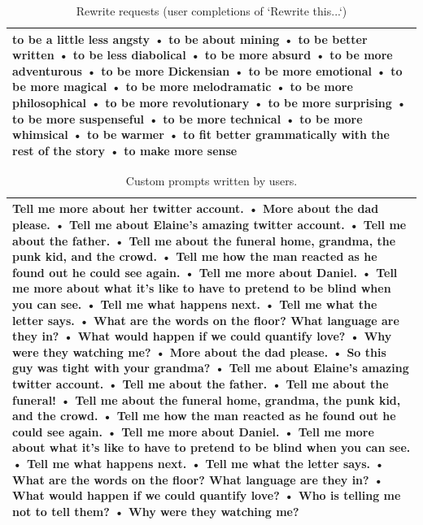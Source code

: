 \begin{table}
\caption{Rewrite requests (user completions of `Rewrite this...`)}
\label{tab:rewrites}
\small
\begin{tabular}{p{}}
\toprule
to be a little less angsty • to be about mining • to be better written • to be less diabolical • to be more absurd • to be more adventurous • to be more Dickensian • to be more emotional • to be more magical • to be more melodramatic • to be more philosophical • to be more revolutionary • to be more surprising • to be more suspenseful • to be more technical • to be more whimsical • to be warmer • to fit better grammatically with the rest of the story • to make more sense \\
\bottomrule
\end{tabular}
\end{table}

\begin{table}
\caption{Custom prompts written by users.}
\label{tab:custom_prompts}
\small
\begin{tabular}{p{}}
\toprule
Tell me more about her twitter account. • More about the dad please. • Tell me about Elaine's amazing twitter account. • Tell me about the father. • Tell me about the funeral home, grandma, the punk kid, and the crowd. • Tell me how the man reacted as he found out he could see again. • Tell me more about Daniel. • Tell me more about what it's like to have to pretend to be blind when you can see. • Tell me what happens next. • Tell me what the letter says. • What are the words on the floor? What language are they in? • What would happen if we could quantify love? • Why were they watching me? • More about the dad please. • So this guy was tight with your grandma? • Tell me about Elaine's amazing twitter account. • Tell me about the father. • Tell me about the funeral! • Tell me about the funeral home, grandma, the punk kid, and the crowd. • Tell me how the man reacted as he found out he could see again. • Tell me more about Daniel. • Tell me more about what it's like to have to pretend to be blind when you can see. • Tell me what happens next. • Tell me what the letter says. • What are the words on the floor? What language are they in? • What would happen if we could quantify love? • Who is telling me not to tell them? • Why were they watching me? \\
\bottomrule
\end{tabular}
\end{table}

